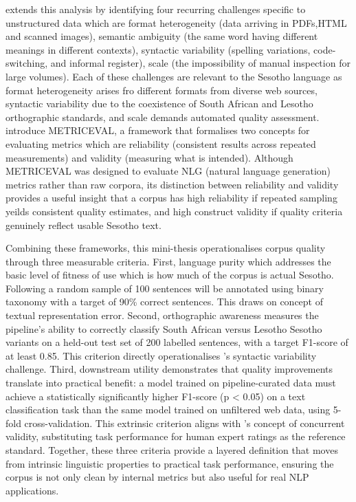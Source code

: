 \documentclass[11pt,a4paper]{article}
\begin{document}
\citet{wang2026modernizing} extends this analysis by identifying four recurring challenges specific to unstructured data which are format heterogeneity (data arriving in PDFs,HTML and scanned images), semantic ambiguity (the same word having different meanings in different contexts), syntactic variability (spelling variations, code-switching, and informal register), scale (the impossibility of manual inspection for large volumes). Each of these challenges are relevant to the Sesotho language as format heterogeneity arises fro different formats from diverse web sources, syntactic variability due to the coexistence of South African and Lesotho orthographic standards, and scale demands  automated quality assessment. \citet{xiao2023evaluating}  introduce METRICEVAL, a framework that formalises two concepts for evaluating metrics which are reliability (consistent results across repeated measurements) and validity (measuring what is intended). Although METRICEVAL was designed to evaluate NLG (natural language generation) metrics rather than raw corpora, its distinction between reliability and validity provides a useful insight that a corpus has high reliability if repeated sampling yeilds consistent quality estimates, and high construct validity if quality criteria genuinely reflect usable Sesotho text.

Combining these frameworks, this mini-thesis operationalises corpus quality through three measurable criteria. First, language purity which addresses  the basic level of fitness of use which is how much of the corpus is actual Sesotho. Following \citet{kreutzer-etal-2022-quality} a random sample of 100 sentences will be annotated using binary taxonomy with a target of 90\% correct sentences. This draws on \citet{hurtado2022documents} concept of textual representation error.  Second, orthographic awareness measures the pipeline's ability to correctly classify South African versus Lesotho Sesotho variants on a held-out test set of 200 labelled sentences, with a target F1-score of at least 0.85. This criterion directly operationalises \citet{wang2026modernizing}'s syntactic variability challenge. Third, downstream utility demonstrates that quality improvements translate into practical benefit: a model trained on pipeline-curated data must achieve a statistically significantly higher F1-score (p < 0.05) on a text classification task than the same model trained on unfiltered web data, using 5-fold cross-validation. This extrinsic criterion aligns with \citet{xiao2023evaluating}'s concept of concurrent validity, substituting task performance for human expert ratings as the reference standard. Together, these three criteria provide a layered definition that moves from intrinsic linguistic properties to practical task performance, ensuring the corpus is not only clean by internal metrics but also useful for real NLP applications.
\end{document}
